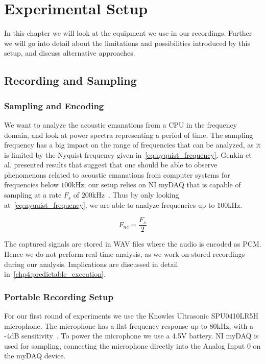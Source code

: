 \chapter{Experimental Setup}
\label{chp:experimental_setup}
In this chapter we will look at the equipment we use in our recordings.
Further we will go into detail about the limitations and possibilities introduced by this setup, and discuss alternative approaches.


\section{Recording and Sampling}\label{chp3:sec:microphone_selection}

\subsection{Sampling and Encoding}
We want to analyze the acoustic emanations from a \gls{CPU} in the frequency domain, and look at power spectra representing a period of time.
The sampling frequency has a big impact on the range of frequencies that can be analyzed, as it is limited by the Nyquist frequency given in~\autoref{eq:nyquist_frequency}.
Genkin et al. presented results that suggest that one should be able to observe phenomenons related to acoustic emanations from computer systems for frequencies below \(100\)kHz; our setup relies on \gls{NI} myDAQ that is capable of sampling at a rate \({F_{s}}\) of \(200\)kHz~\footnotemark.
Thus by only looking at~\autoref{eq:nyquist_frequency}, we are able to analyze frequencies up to \(100\)kHz.



\begin{equation}\label{eq:nyquist_frequency}
F_{nc} = \frac{F_{s}}{2}
\end{equation}

The captured signals are stored in \gls{WAV} files where the audio is encoded as \gls{PCM}.
Hence we do not perform real-time analysis, as we work on stored recordings during our analysis.
Implications are discussed in detail in~\autoref{chp4:predictable_execution}.


\subsection{Portable Recording Setup}\label{chp3:sec:knowles_configuration}
For our first round of experiments we use the Knowles Ultrasonic SPU0410LR5H microphone.
The microphone has a flat frequency response up to 80kHz, with a -4dB sensitivity~\cite{url:knowles_spec}.
To power the microphone we use a 4.5V battery.
\gls{NI} myDAQ is used for sampling, connecting the microphone directly into the Analog Input 0 on the myDAQ device.

